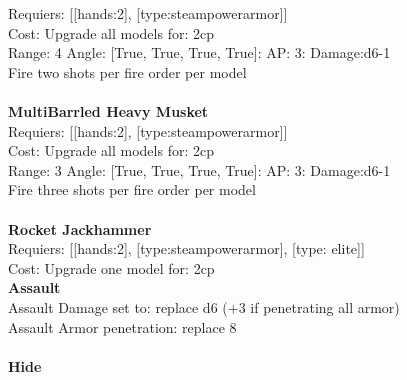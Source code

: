 Requiers: [[hands:2], [type:steampowerarmor]] \\
Cost: Upgrade all models for: 2cp \\


Range: 4  Angle: [True, True, True, True]: AP: 3: Damage:d6-1 \\
Fire two shots per fire order per model\\ 








\ \\
{\bf MultiBarrled Heavy Musket } \\

Requiers: [[hands:2], [type:steampowerarmor]] \\
Cost: Upgrade all models for: 2cp \\


Range: 3  Angle: [True, True, True, True]: AP: 3: Damage:d6-1 \\
Fire three shots per fire order per model\\ 








\ \\
{\bf Rocket Jackhammer } \\

Requiers: [[hands:2], [type:steampowerarmor], [type: elite]] \\
Cost: Upgrade one model for: 2cp \\




{\bf Assault} \ \\
Assault Damage set to: replace d6 (+3 if penetrating all armor)
\\ 
Assault Armor penetration: replace 8 
\\ 




\ \\
{\bf Hide } \\

